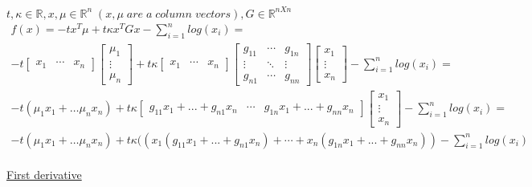 \documentclass[fleqn]{article}
\begin{document}
$t, \kappa \in \mathbb{R}, x, \mu \in \mathbb{R}^n \; (x,\mu \; are \; a \; column \; vectors), G \in \mathbb{R}^{nXn}$ \\


\begin{multline*}
f(x) = -tx^T \mu + t \kappa x^T Gx - \sum_{i=1}^{n} log(x_i) = \\
-t \begin{bmatrix} x_1 & \cdots & x_n \end{bmatrix}
\begin{bmatrix} \mu_1 \\ \vdots \\ \mu_n \end{bmatrix} +
t \kappa
\begin{bmatrix} x_1 & \cdots & x_n \end{bmatrix}
\begin{bmatrix} g_{11} & \cdots & g_{1n}   \\
				\vdots & \ddots & \vdots \\				
				g_{n1} & \cdots & g_{nn}
\end{bmatrix}
\begin{bmatrix} x_1 \\ \vdots \\ x_n \end{bmatrix} -
\sum_{i=1}^{n} log(x_i) = \\
-t(\mu_1 x_1 + \dots \mu_n x_n) +
t \kappa
\begin{bmatrix}
	g_{11}x_1 + ... + g_{n1}x_n &
		\cdots 					&
	g_{1n}x_1 +...+g_{nn}x_n
\end{bmatrix}
\begin{bmatrix} x_1 \\ \vdots \\ x_n \end{bmatrix}-
\sum_{i=1}^{n} log(x_i) = \\
-t(\mu_1 x_1 + \dots \mu_n x_n) +
t \kappa
 ((x_1(g_{11}x_1 + ... + g_{n1}x_n)+\cdots+x_n(g_{1n}x_1 +...+g_{nn}x_n))
-\sum_{i=1}^{n} log(x_i)
\end{multline*} \\








\underline{First derivative}\\
\end{document}
